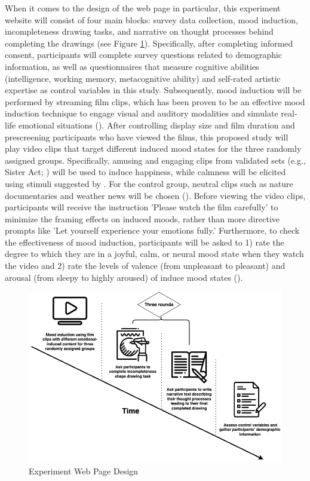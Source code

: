 \documentclass[../Proposal.tex]{subfiles}
\begin{document}
When it comes to the design of the web page in particular, this experiment website will consist of four main blocks: survey data collection, mood induction, incompleteness drawing tasks, and narrative on thought processes behind completing the drawings (see Figure \ref{fig: Experiment Web Page Design}). Specifically, after completing informed consent, participants will complete survey questions related to demographic information, as well as questionnaires that measure cognitive abilities (intelligence, working memory, metacognitive ability) and self-rated artistic expertise as control variables in this study. Subsequently, mood induction will be performed by streaming film clips, which has been proven to be an effective mood induction technique to engage visual and auditory modalities and simulate real-life emotional situations (\cite{siedlecka_experimental_2019}). After controlling display size and film duration and prescreening participants who have viewed the films, this proposed study will play video clips that target different induced mood states for the three randomly assigned groups. Specifically, amusing and engaging clips from validated sets (e.g., Sister Act; \cite{maryam_fakhrhosseini_affectemotion_2017}) will be used to induce happiness, while calmness will be elicited using stimuli suggested by \textcite{kimura_emotional_2019}. For the control group, neutral clips such as nature documentaries and weather news will be chosen (\cite{siedlecka_experimental_2019}). Before viewing the video clips, participants will receive the instruction 'Please watch the film carefully' to minimize the framing effects on induced moods, rather than more directive prompts like 'Let yourself experience your emotions fully.' Furthermore, to check the effectiveness of mood induction, participants will be asked to 1) rate the degree to which they are in a joyful, calm, or neural mood state when they watch the video and 2) rate the levels of valence (from unpleasant to pleasant) and arousal (from sleepy to highly aroused) of induce mood states (\cite{kucera_using_2012}).

\begin{figure}
    \centering
    \includegraphics[width=0.7\linewidth, keepaspectratio]{drawio/Experiment Timeline.png}
    \caption{Experiment Web Page Design}
    \label{fig: Experiment Web Page Design}
\end{figure}
\end{document}
